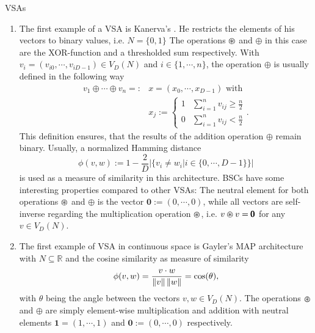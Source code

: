 \begin{ex} \aclp{VSA}
	\label{ex:VSAs}
	\begin{enumerate}
		\item The first example of a \ac{VSA} is Kanerva's  \cite{Kanerva2009}. 
		He restricts the elements of his vectors to binary values, i.e. $N=\{0,1\}$
		The operations $\varoast$ and $\oplus$ in this case are the XOR-function and a thresholded sum respectively.
		With $v_{i} = \left(v_{i 0}, \cdots, v_{i D-1}\right) \in V_{D}(N)$ and  $i \in \{1, \cdots, n\}$, the operation $\oplus$ is usually defined in the following way
		\begin{align*}
			v_{1} \oplus \cdots \oplus v_{n} =: &x = \left(x_{0}, \cdots, x_{D-1}\right) \textrm{ with } \\
			&x_{j}:= \begin{cases}
				1 & \sum\limits_{i=1}^{n} v_{ij} \geq \frac{n}{2} \\
				0 & \sum\limits_{i=1}^{n} v_{ij} < \frac{n}{2}
			\end{cases}.
		\end{align*}
		This definition ensures, that the results of the addition operation $\oplus$ remain binary.
		Usually, a normalized Hamming distance 
		\[
		\phi(v,w) := 1 - \frac{2}{D} \left| \{ v_{i} \neq w_{i} | i \in \{0, \cdots, D-1\} \} \right|
		\]
		is used as a measure of similarity in this architecture.
		\acp{BSC} have some interesting properties compared to other \acp{VSA}: 
		The neutral element for both operations $\varoast$ and $\oplus$ is the vector $\pmb{0} := \left(0, \cdots, 0\right)$, while all vectors are self-inverse regarding the multiplication operation $\varoast$, i.e. $v \varoast v = \pmb{0}$ for any $v \in V_{D}(N)$.
		
		\item The first example of \ac{VSA} in continuous space is Gayler's \acrfull{MAP} architecture \cite{Gayler1998} with $N \subseteq \mathbb{R}$ and the cosine similarity as measure of similarity 
		\[
		\phi(v,w) = \frac{v \cdot w}{\left\| v \right\|\left\| w \right\|}=\cos(\theta),
		\]
		with $\theta$ being the angle between the vectors $v,w \in V_{D}(N)$.
		The operations $\varoast$ and $\oplus$ are simply element-wise multiplication and addition with neutral elements $\pmb{1}=\left(1, \cdots, 1\right)$ and $\pmb{0} := \left(0, \cdots, 0\right)$ respectively.
		

\end{enumerate}
\end{ex}
